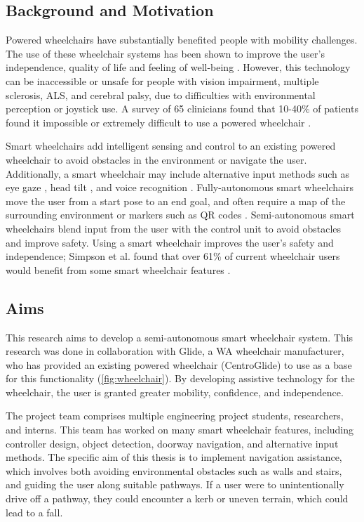 \subsection{Background and Motivation}
Powered wheelchairs have substantially benefited people with mobility challenges.
The use of these wheelchair systems has been shown to improve the user's independence, quality
of life and feeling of well-being \cite{treflerOutcomesWheelchairSystems2004}.
However, this technology can be inaccessible or unsafe for people with vision impairment,
multiple sclerosis, ALS, and cerebral palsy, due to difficulties with environmental perception
or joystick use. A survey of 65 clinicians found that 10-40\% of patients found it impossible or
extremely difficult to use a powered wheelchair \cite{fehrAdequacyPowerWheelchair2000}.

Smart wheelchairs add intelligent sensing and control to an existing powered wheelchair
to avoid obstacles in the environment or navigate the user.
Additionally, a smart wheelchair may include alternative input methods such as
eye gaze \cite{eidNovelEyeGazeControlledWheelchair2016}, head tilt \cite{tomariEnhancingWheelchairControl2014},
and voice recognition \cite{bakouriSteeringRoboticWheelchair2022}.
Fully-autonomous smart wheelchairs move the user from a start pose to an end goal,
and often require a map of the surrounding environment or markers
such as QR codes \cite{habhaAutonomousWheelchairIndoorOutdoor2021}.
Semi-autonomous smart wheelchairs blend input from the user with the control unit
to avoid obstacles and improve safety. Using a smart wheelchair improves the user's
safety and independence; Simpson et al. found that over 61\% of
current wheelchair users would benefit from some smart wheelchair features \cite{simpsonHowManyPeople2008}.

\subsection{Aims}
This research aims to develop a semi-autonomous smart wheelchair system.
This research was done in collaboration with Glide, a WA wheelchair manufacturer,
who has provided an existing powered wheelchair (CentroGlide) to use as a base
for this functionality (\cref{fig:wheelchair}). By developing assistive technology for the wheelchair,
the user is granted greater mobility, confidence, and independence.

The project team comprises multiple engineering project students, researchers, and interns.
This team has worked on many smart wheelchair features, including controller design,
object detection, doorway navigation, and alternative input methods.
The specific aim of this thesis is to implement navigation assistance,
which involves both avoiding environmental obstacles such as walls and stairs,
and guiding the user along suitable pathways. If a user were to unintentionally
drive off a pathway, they could encounter a kerb or uneven terrain, which could lead
to a fall.

